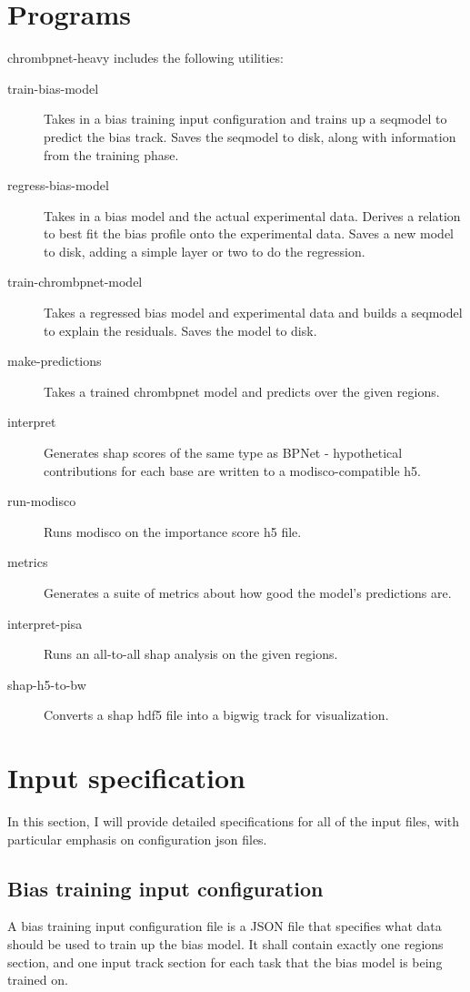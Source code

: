 \documentclass{article}
\begin{document}
\section{Programs}
chrombpnet-heavy includes the following utilities:
\begin{description}
    \item [train-bias-model] Takes in a bias training input configuration and trains up a seqmodel to predict the bias track. Saves the seqmodel to disk, along with information from the training phase. 
    \item [regress-bias-model] Takes in a bias model and the actual experimental data. Derives a relation to best fit the bias profile onto the experimental data. Saves a new model to disk, adding a simple layer or two to do the regression. 
    \item [train-chrombpnet-model] Takes a regressed bias model and experimental data and builds a seqmodel to explain the residuals. Saves the model to disk. 
    \item [make-predictions] Takes a trained chrombpnet model and predicts over the given regions. 
    \item [interpret] Generates shap scores of the same type as BPNet - hypothetical contributions for each base are written to a modisco-compatible h5. 
    \item [run-modisco] Runs modisco on the importance score h5 file. 
    \item [metrics] Generates a suite of metrics about how good the model's predictions are. 
    \item [interpret-pisa] Runs an all-to-all shap analysis on the given regions. 
    \item [shap-h5-to-bw] Converts a shap hdf5 file into a bigwig track for visualization. 
\end{description}


\section{Input specification}
In this section, I will provide detailed specifications for all of the input files, with particular emphasis on configuration json files.

\subsection{Bias training input configuration}
A bias training input configuration file is a JSON file that specifies what data should be used to train up the bias model.
It shall contain exactly one regions section, and one input track section for each task that the bias model is being trained on. 
\end{document}
